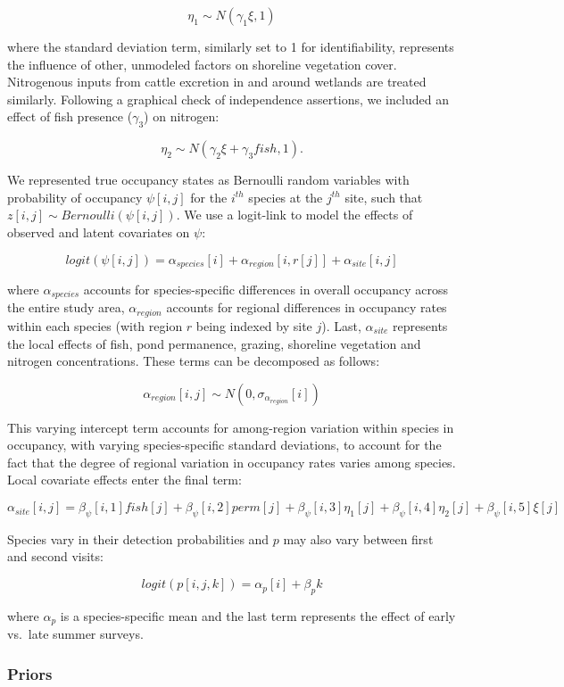 \[\eta_1 \sim N(\gamma_{1} \xi, 1)\]

where the standard deviation term, similarly set to 1 for
identifiability, represents the influence of other, unmodeled factors on
shoreline vegetation cover. Nitrogenous inputs from cattle excretion in
and around wetlands are treated similarly. Following a graphical check
of independence assertions, we included an effect of fish presence
($\gamma_3$) on nitrogen:

\[\eta_2 \sim N(\gamma_{2} \xi + \gamma_3 fish, 1).\]

We represented true occupancy states as Bernoulli random variables with
probability of occupancy $\psi[i, j]$ for the $i^{th}$ species at the
$j^{th}$ site, such that $z[i, j] \sim Bernoulli(\psi[i,j])$. We use a
logit-link to model the effects of observed and latent covariates on
$\psi$:

\[ logit(\psi[i, j]) = \alpha_{species}[i] + \alpha_{region}[i, r[j]] + \alpha_{site}[i, j]\]

where $\alpha_{species}$ accounts for species-specific differences in
overall occupancy across the entire study area, $\alpha_{region}$
accounts for regional differences in occupancy rates within each species
(with region $r$ being indexed by site $j$). Last, $\alpha_{site}$
represents the local effects of fish, pond permanence, grazing,
shoreline vegetation and nitrogen concentrations. These terms can be
decomposed as follows:

\[\alpha_{region}[i, j] \sim N(0, \sigma_{\alpha_{region}}[i])\]

This varying intercept term accounts for among-region variation within
species in occupancy, with varying species-specific standard deviations,
to account for the fact that the degree of regional variation in
occupancy rates varies among species. Local covariate effects enter the
final term:

\[\alpha_{site}[i, j] = \beta_{\psi}[i, 1] fish[j] + \beta_{\psi}[i, 2] perm[j] + \beta_{\psi}[i, 3] \eta_1[j] + \beta_{\psi}[i, 4] \eta_2[j] + \beta_{\psi}[i, 5] \xi[j]\]

Species vary in their detection probabilities and $p$ may also vary
between first and second visits:

\[ logit(p[i, j, k]) = \alpha_{p}[i] + \beta_{p} k \]

where $\alpha_{p}$ is a species-specific mean and the last term
represents the effect of early vs.~late summer surveys.

\subsubsection{Priors}

